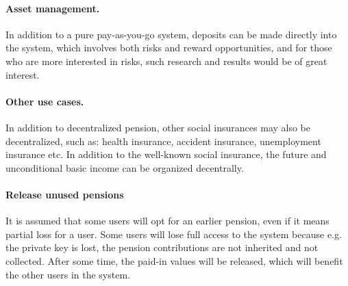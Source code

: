 \paragraph{Asset management.} In addition to a pure pay-as-you-go system, deposits can be made directly into the system, which involves both risks and reward opportunities, and for those who are more interested in risks, such research and results would be of great interest.

\paragraph{Other use cases.} In addition to decentralized pension, other social insurances may also be decentralized, such as: health insurance, accident insurance, unemployment insurance etc. In addition to the well-known social insurance, the future and unconditional basic income can be organized decentrally. 

\paragraph{Release unused pensions} It is assumed that some users will opt for an earlier pension, even if it means partial loss for a user. Some users will lose full access to the system because e.g. the private key is lost, the pension contributions are not inherited and not collected. After some time, the paid-in values will be released, which will benefit the other users in the system.

